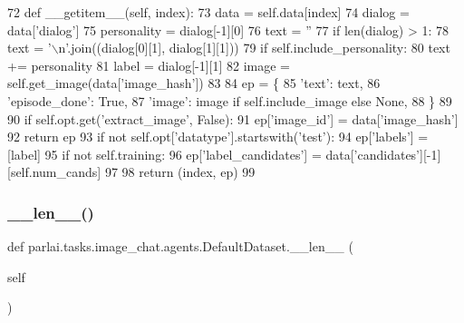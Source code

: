 \begin{DoxyCode}
72     \textcolor{keyword}{def }\_\_getitem\_\_(self, index):
73         data = self.data[index]
74         dialog = data[\textcolor{stringliteral}{'dialog'}]
75         personality = dialog[-1][0]
76         text = \textcolor{stringliteral}{''}
77         \textcolor{keywordflow}{if} len(dialog) > 1:
78             text = \textcolor{stringliteral}{'\(\backslash\)n'}.join((dialog[0][1], dialog[1][1]))
79         \textcolor{keywordflow}{if} self.include\_personality:
80             text += personality
81         label = dialog[-1][1]
82         image = self.get\_image(data[\textcolor{stringliteral}{'image\_hash'}])
83 
84         ep = \{
85             \textcolor{stringliteral}{'text'}: text,
86             \textcolor{stringliteral}{'episode\_done'}: \textcolor{keyword}{True},
87             \textcolor{stringliteral}{'image'}: image \textcolor{keywordflow}{if} self.include\_image \textcolor{keywordflow}{else} \textcolor{keywordtype}{None},
88         \}
89 
90         \textcolor{keywordflow}{if} self.opt.get(\textcolor{stringliteral}{'extract\_image'}, \textcolor{keyword}{False}):
91             ep[\textcolor{stringliteral}{'image\_id'}] = data[\textcolor{stringliteral}{'image\_hash'}]
92             \textcolor{keywordflow}{return} ep
93         \textcolor{keywordflow}{if} \textcolor{keywordflow}{not} self.opt[\textcolor{stringliteral}{'datatype'}].startswith(\textcolor{stringliteral}{'test'}):
94             ep[\textcolor{stringliteral}{'labels'}] = [label]
95         \textcolor{keywordflow}{if} \textcolor{keywordflow}{not} self.training:
96             ep[\textcolor{stringliteral}{'label\_candidates'}] = data[\textcolor{stringliteral}{'candidates'}][-1][self.num\_cands]
97 
98         \textcolor{keywordflow}{return} (index, ep)
99 
\end{DoxyCode}
\mbox{\label{classparlai_1_1tasks_1_1image__chat_1_1agents_1_1DefaultDataset_ae786128b555cabc38b32841f4569ee62}} 
\subsubsection{\texorpdfstring{\+\_\+\+\_\+len\+\_\+\+\_\+()}{\_\_len\_\_()}}
{\footnotesize\ttfamily def parlai.\+tasks.\+image\+\_\+chat.\+agents.\+Default\+Dataset.\+\_\+\+\_\+len\+\_\+\+\_\+ (\begin{DoxyParamCaption}\item[{}]{self }\end{DoxyParamCaption})}




